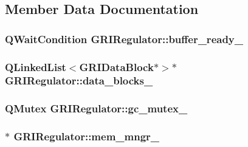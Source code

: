 \subsection{\-Member \-Data \-Documentation}
\hypertarget{classGRIRegulator_ae0fe8063d2012c33caa9f09ee8b078c9}{
\subsubsection[{buffer\-\_\-ready\-\_\-}]{\setlength{\rightskip}{0pt plus 5cm}\-Q\-Wait\-Condition {\bf \-G\-R\-I\-Regulator\-::buffer\-\_\-ready\-\_\-}}}\label{classGRIRegulator_ae0fe8063d2012c33caa9f09ee8b078c9}
\hypertarget{classGRIRegulator_af68ee4d44730f3b5fd07df9ada967ce2}{
\subsubsection[{data\-\_\-blocks\-\_\-}]{\setlength{\rightskip}{0pt plus 5cm}\-Q\-Linked\-List$<${\bf \-G\-R\-I\-Data\-Block}$\ast$$>$$\ast$ {\bf \-G\-R\-I\-Regulator\-::data\-\_\-blocks\-\_\-}}}\label{classGRIRegulator_af68ee4d44730f3b5fd07df9ada967ce2}
\hypertarget{classGRIRegulator_a3b75f15bdae72cbf888084d6e396c8b2}{
\subsubsection[{gc\-\_\-mutex\-\_\-}]{\setlength{\rightskip}{0pt plus 5cm}\-Q\-Mutex {\bf \-G\-R\-I\-Regulator\-::gc\-\_\-mutex\-\_\-}}}\label{classGRIRegulator_a3b75f15bdae72cbf888084d6e396c8b2}
\hypertarget{classGRIRegulator_a9d6026fe67539022cad0e9bb4be60956}{
\subsubsection[{mem\-\_\-mngr\-\_\-}]{$\ast$ {\bf \-G\-R\-I\-Regulator\-::mem\-\_\-mngr\-\_\-}}}\label{classGRIRegulator_a9d6026fe67539022cad0e9bb4be60956}
